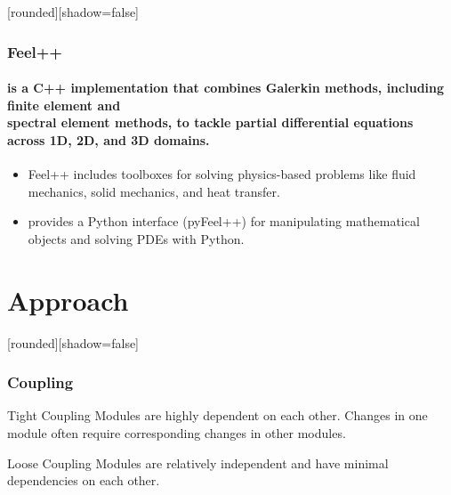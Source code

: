 \documentclass[10pt]{beamer}
\begin{document}
\begin{frame}
    [rounded][shadow=false]
    \frametitle{Feel++}
    \framesubtitle{is a C++ implementation that combines Galerkin methods, including finite element and \\spectral element methods, to tackle partial differential equations across 1D, 2D, and 3D domains.}

    \begin{itemize}
        \item Feel++ includes toolboxes for solving physics-based problems like fluid mechanics, solid mechanics, and heat transfer.
        
        
        \item  provides a Python interface (pyFeel++) for manipulating mathematical objects and solving PDEs with Python. 
        
        
    \end{itemize}
\end{frame}



\section{Approach}

\begin{frame}
    [rounded][shadow=false]
    \frametitle{Coupling}
    \begin{block}{Tight Coupling}
    Modules are highly dependent on each other. Changes in one module often require corresponding changes in other modules.

    \end{block}

    \begin{block}{Loose Coupling}
    Modules are relatively independent and have minimal dependencies on each other.


    \end{block}
\end{frame}
\end{document}
